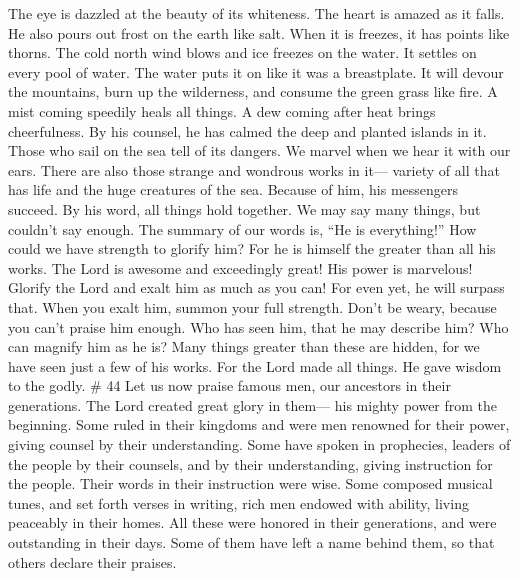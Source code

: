  The eye is dazzled at the beauty of its whiteness. The
heart is amazed as it falls.  He also pours out frost on
the earth like salt. When it is freezes, it has points like thorns.
 The cold north wind blows and ice freezes on the water.
It settles on every pool of water. The water puts it on like it was a
breastplate.  It will devour the mountains, burn up the
wilderness, and consume the green grass like fire.  A
mist coming speedily heals all things. A dew coming after heat brings
cheerfulness.  By his counsel, he has calmed the deep and
planted islands in it.  Those who sail on the sea tell of
its dangers. We marvel when we hear it with our ears. 
There are also those strange and wondrous works in it--- variety of all
that has life and the huge creatures of the sea.  Because
of him, his messengers succeed. By his word, all things hold together.
 We may say many things, but couldn't say enough. The
summary of our words is, ``He is everything!''  How could
we have strength to glorify him? For he is himself the greater than all
his works.  The Lord is awesome and exceedingly great!
His power is marvelous!  Glorify the Lord and exalt him
as much as you can! For even yet, he will surpass that. When you exalt
him, summon your full strength. Don't be weary, because you can't praise
him enough.  Who has seen him, that he may describe him?
Who can magnify him as he is?  Many things greater than
these are hidden, for we have seen just a few of his works.
 For the Lord made all things. He gave wisdom to the
godly. \# 44  Let us now praise famous men, our ancestors
in their generations.  The Lord created great glory in
them--- his mighty power from the beginning.  Some ruled
in their kingdoms and were men renowned for their power, giving counsel
by their understanding. Some have spoken in prophecies, 
leaders of the people by their counsels, and by their understanding,
giving instruction for the people. Their words in their instruction were
wise.  Some composed musical tunes, and set forth verses
in writing,  rich men endowed with ability, living
peaceably in their homes.  All these were honored in their
generations, and were outstanding in their days.  Some of
them have left a name behind them, so that others declare their praises.
